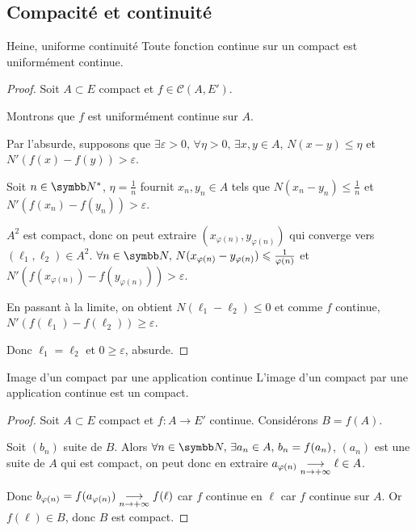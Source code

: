 \subsection{Compacité et continuité}

\begin{theoreme}{Heine, uniforme continuité}{}
    Toute fonction continue sur un compact est uniformément continue. 
\end{theoreme}


\begin{proof}
    Soit $A \subset E$ compact et $f \in \mathscr C(A, E')$. 

    Montrons que $f$ est uniformément continue sur $A$. 

    Par l'absurde, supposons que $\exists \varepsilon > 0, \, \forall \eta > 0, \, \exists x, y \in A, \, N(x - y) \leqslant \eta$ et $N'(f(x) - f(y)) > \varepsilon$.

    Soit $n \in \N^*$, $\eta = \frac 1 n$ fournit $x_n, y_n \in A$ tels que $N(x_n - y_n) \leqslant \frac 1 n$
    et $N'(f(x_n) - f(y_n)) > \varepsilon$.

    $A^2$ est compact, donc on peut extraire $(x_{\varphi(n)}, y_{\varphi(n)})$ qui converge vers $(\ell_1, \ell_2) \in A^2$.
    $\forall n \in \N, \, N(x_{\varphi(n)} - y_{\varphi(n)}) \leqslant \frac 1 {\varphi(n)}$ et $N'(f(x_{\varphi(n)}) - f(y_{\varphi(n)})) > \varepsilon$.

    En passant à la limite, on obtient $N(\ell_1 - \ell_2) \leqslant 0$ et comme $f$ continue, 
    $N'(f(\ell_1) - f(\ell_2)) \geqslant \varepsilon$.

    Donc $\ell_1 = \ell_2$ et $0 \geqslant \varepsilon$, absurde.
\end{proof}

\begin{theoreme}{Image d'un compact par une application continue}{}
    L'image d'un compact par une application continue est un compact. 
\end{theoreme}


\begin{proof}
    Soit $A \subset E$ compact et $f : A \to E'$ continue. Considérons $B = f(A)$. 

    Soit $(b_n)$ suite de $B$. Alors $\forall n \in \N, \, \exists a_n \in A, \, b_n = f(a_n)$,
    $(a_n)$ est une suite de $A$ qui est compact, on peut donc en extraire 
    $a_{\varphi(n)} \underset{n \to + \infty}{\longrightarrow} \ell \in A$. 

    Donc $b_{\varphi(n)} = f(a_{\varphi(n)}) \underset{n \to + \infty}{\longrightarrow} f(\ell) $ car $f$ continue en 
    $\ell$ car $f$ continue sur $A$. Or $f(\ell) \in B$, donc $B$ est compact.
\end{proof}

